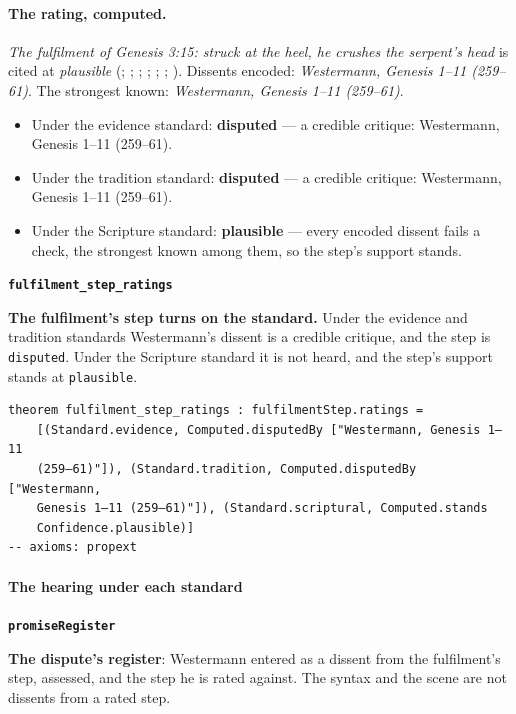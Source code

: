 \documentclass[11pt]{article}
\begin{document}
\paragraph{The rating, computed.} \emph{The fulfilment of Genesis 3:15: struck at the heel, he crushes the serpent’s head} is cited at \emph{plausible} (\cite[III.23.7]{irenaeus-against-heresies-180}; \cite[IV.40.3]{irenaeus-against-heresies-180}; \cite[42, 53]{hamilton-skull-crushing-seed-2006}; \cite[102]{keil-delitzsch-pentateuch-1866}; \cite[170]{leupold-exposition-genesis-1942}; \cite[170--171]{calvin-commentary-genesis-1847}; \cite[259--261]{westermann-genesis-1-11-1984}). Dissents encoded: \emph{Westermann, Genesis 1–11 (259–61)}. The strongest known: \emph{Westermann, Genesis 1–11 (259–61)}.
\begin{itemize}
\item Under the evidence standard: \textbf{disputed} --- a credible critique: Westermann, Genesis 1–11 (259–61).
\item Under the tradition standard: \textbf{disputed} --- a credible critique: Westermann, Genesis 1–11 (259–61).
\item Under the Scripture standard: \textbf{plausible} --- every encoded dissent fails a check, the strongest known among them, so the step’s support stands.
\end{itemize}
\par\medskip\noindent\textbf{\texttt{fulfilment\_\allowbreak{}step\_\allowbreak{}ratings}}\par\nobreak\noindent
\textbf{The fulfilment’s step turns on the standard.} Under the evidence and tradition standards Westermann’s dissent is a credible critique, and the step is \texttt{disputed}. Under the Scripture standard it is not heard, and the step’s support stands at \texttt{plausible}.

{\small\begin{verbatim}
theorem fulfilment_step_ratings : fulfilmentStep.ratings =
    [(Standard.evidence, Computed.disputedBy ["Westermann, Genesis 1–11
    (259–61)"]), (Standard.tradition, Computed.disputedBy ["Westermann,
    Genesis 1–11 (259–61)"]), (Standard.scriptural, Computed.stands
    Confidence.plausible)]
-- axioms: propext
\end{verbatim}}
\paragraph*{The hearing under each standard}
\leavevmode\par\nobreak
\par\medskip\noindent\textbf{\texttt{promise\allowbreak{}Register}}\par\nobreak\noindent
\textbf{The dispute’s register}: Westermann entered as a dissent from the fulfilment’s step, assessed, and the step he is rated against. The syntax and the scene are not dissents from a rated step.
\end{document}
